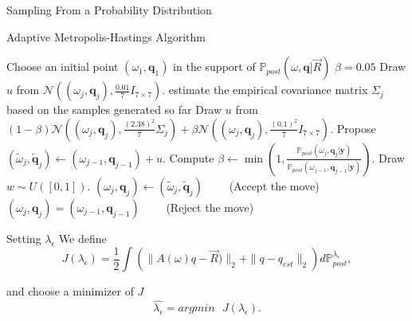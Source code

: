 \documentclass[11pt]{beamer}
\theoremstyle{plain}
\theoremstyle{definition}
\newcommand\ChangeFont{\fontsize{7}{7.2}\selectfont}
\newcommand{\y}{\textbf{y}}
\newcommand{\p}{\mathbb{P}}
\newcommand{\post}{\p_{post}}
\newcommand{\q}{\textbf{q}}
\begin{document}
\begin{frame}{Sampling From a Probability Distribution}
%
\begin{algorithm}[H]
\ChangeFont
\caption{Adaptive Metropolis-Hastings Algorithm}
\begin{algorithmic}[1]\label{algMH}
\State Choose an initial point $(\omega_{1},\q_{1})$ in the support of $\post(\omega,\q|\vec{R})$
\State $\beta=0.05$
\State Draw $u$ from $\mathcal{N}((\omega_{j},\q_{j}),\frac{0.01}{7}I_{7\times 7})$.
\Else
\State estimate the empirical covariance matrix $\Sigma_{j}$ based on the samples generated so far
\State Draw $u$ from $(1-\beta)\mathcal{N}((\omega_{j},\q_{j}),\frac{(2.38)^{2}}{7}\Sigma_{j})+\beta\mathcal{N}((\omega_{j},\q_{j}),\frac{(0.1)^{2}}{7}I_{7\times 7})$.
\EndIf
\State Propose $(\tilde{\omega}_j,\tilde{\q}_{j})\leftarrow (\omega_{j-1},\q_{j-1})+u$.
\State Compute 
$\beta\leftarrow\min \left(1,\frac{\post(\omega_{j},\q_{j}|\y)}{\post(\omega_{j-1},\q_{j-1}|\y)} \right)$.
\State Draw $w\sim U([0,1])$.
\State $(\omega_{j},\q_{j}) \leftarrow (\tilde{\omega}_{j},\tilde{\q}_{j})\qquad$   (Accept the move)
\Else
\State $(\omega_{j},\q_{j})=(\omega_{j-1},\q_{j-1})\qquad$ (Reject the move)
\EndIf
\EndFor
\end{algorithmic}
\end{algorithm}
\end{frame}

\begin{frame}{Setting $\lambda_{\epsilon}$}
We define
\begin{equation*}
J(\lambda_{\epsilon})=\frac{1}{2}\int\left(\|A(\omega)q-\vec{R})\|_{2}+\|q-q_{est}\|_{2}\right)d\post^{\lambda_{\epsilon}},
\end{equation*}

and choose a minimizer of $J$ 
\begin{equation*}
\hat{\lambda_{\epsilon}}=argmin\text{ } J(\lambda_{\epsilon}).
\end{equation*}

\end{frame}
\end{document}
